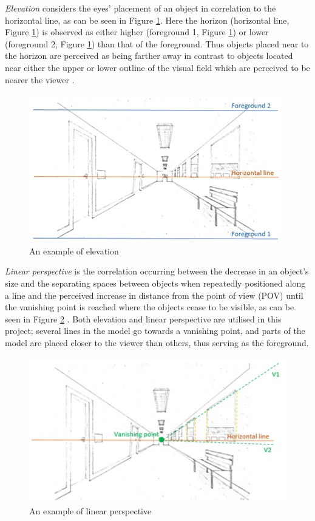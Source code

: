 \pagebreak
\textit{Elevation} considers the eyes' placement of an object in correlation to the horizontal line, as can be seen in Figure \ref{fig:cue3}. Here the horizon (horizontal line, Figure \ref{fig:cue3}) is observed as either higher (foreground 1, Figure \ref{fig:cue3}) or lower  (foreground 2, Figure \ref{fig:cue3}) than that of the foreground. Thus objects placed near to the horizon are perceived as being farther away in contrast to objects located near either the upper or lower outline of the visual field which are perceived to be nearer the viewer \cite{Gale}.

\begin{figure}[h!]
   \centering
   \includegraphics[scale=0.85]{figures/cue3.jpg}
   \caption{An example of elevation}\label{fig:cue3}
\end{figure}

\textit{Linear perspective} is the correlation occurring between the decrease in an object’s size and the separating spaces between objects when repeatedly positioned along a line and the perceived increase in distance from the point of view (POV) until the vanishing point is reached where the objects cease to be visible, as can be seen in Figure \ref{fig:cue4} \cite{Gale}. Both elevation and linear perspective are utilised in this project; several lines in the model go towards a vanishing point, and parts of the model are placed closer to the viewer than others, thus serving as the foreground.

\begin{figure}[h!]
   \centering
   \includegraphics[scale=0.85]{figures/cue4.jpg}
   \caption{An example of linear perspective}\label{fig:cue4}
\end{figure}

